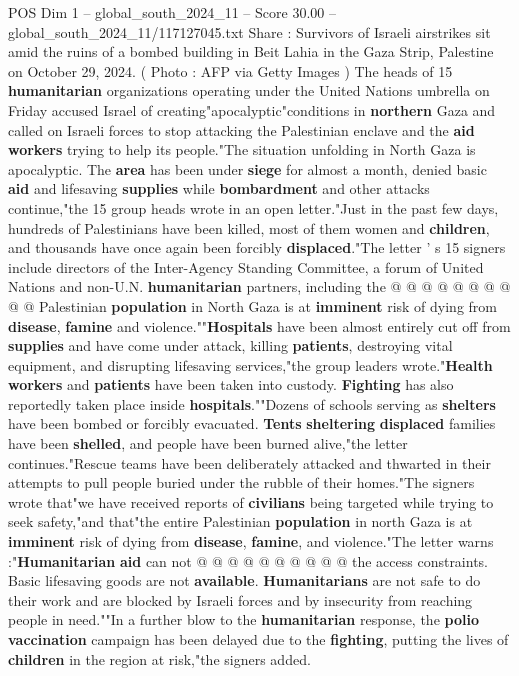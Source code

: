 \begin{textsample}{POS Dim 1 – global\_south\_2024\_11 – Score 30.00 – global\_south\_2024\_11/117127045.txt}  \label{ex:f1_pos_247}
Share : Survivors of Israeli airstrikes sit amid the ruins of a bombed building in Beit Lahia in the Gaza Strip, Palestine on October 29, 2024. ( Photo : AFP via Getty Images ) The heads of 15 \textbf{humanitarian} organizations operating under the United Nations umbrella on Friday accused Israel of creating"apocalyptic"conditions in \textbf{northern} Gaza and called on Israeli forces to stop attacking the Palestinian enclave and the \textbf{aid} \textbf{workers} trying to help its people."The situation unfolding in North Gaza is apocalyptic.
The \textbf{area} has been under \textbf{siege} for almost a month, denied basic \textbf{aid} and lifesaving \textbf{supplies} while \textbf{bombardment} and other attacks continue,"the 15 group heads wrote in an open letter."Just in the past few days, hundreds of Palestinians have been killed, most of them women and \textbf{children}, and thousands have once again been forcibly \textbf{displaced}."The letter ' s 15 signers include directors of the Inter-Agency Standing Committee, a forum of United Nations and non-U.N. \textbf{humanitarian} partners, including the @ @ @ @ @ @ @ @ @ @ Palestinian \textbf{population} in North Gaza is at \textbf{imminent} risk of dying from \textbf{disease}, \textbf{famine} and violence.""\textbf{Hospitals} have been almost entirely cut off from \textbf{supplies} and have come under attack, killing \textbf{patients}, destroying vital equipment, and disrupting lifesaving services,"the group leaders wrote."\textbf{Health} \textbf{workers} and \textbf{patients} have been taken into custody. \textbf{Fighting} has also reportedly taken place inside \textbf{hospitals}.""Dozens of schools serving as \textbf{shelters} have been bombed or forcibly evacuated. \textbf{Tents} \textbf{sheltering} \textbf{displaced} families have been \textbf{shelled}, and people have been burned alive,"the letter continues."Rescue teams have been deliberately attacked and thwarted in their attempts to pull people buried under the rubble of their homes."The signers wrote that"we have received reports of \textbf{civilians} being targeted while trying to seek safety,"and that"the entire Palestinian \textbf{population} in north Gaza is at \textbf{imminent} risk of dying from \textbf{disease}, \textbf{famine}, and violence."The letter warns :"\textbf{Humanitarian} \textbf{aid} can not @ @ @ @ @ @ @ @ @ @ the access constraints.
Basic lifesaving goods are not \textbf{available}. \textbf{Humanitarians} are not safe to do their work and are blocked by Israeli forces and by insecurity from reaching people in need.""In a further blow to the \textbf{humanitarian} response, the \textbf{polio} \textbf{vaccination} campaign has been delayed due to the \textbf{fighting}, putting the lives of \textbf{children} in the region at risk,"the signers added.

\end{textsample}

